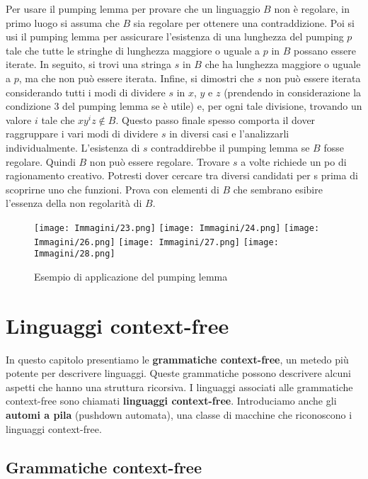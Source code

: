 \documentclass{article}
\begin{document}
Per usare il pumping lemma per provare che un linguaggio $B$ non è regolare, in primo luogo si assuma che $B$ sia regolare per ottenere una contraddizione. Poi si usi il pumping lemma per assicurare l'esistenza di una lunghezza del pumping $p$ tale che tutte le stringhe di lunghezza maggiore o uguale a $p$ in $B$ possano essere iterate. In seguito, si trovi una stringa $s$ in $B$ che ha lunghezza maggiore o uguale a $p$, ma che non può essere iterata. Infine, si dimostri che $s$ non può essere iterata considerando tutti i modi di dividere $s$ in $x$, $y$ e $z$ (prendendo in considerazione la condizione 3 del pumping lemma
se è utile) e, per ogni tale divisione, trovando un valore $i$ tale che $xy^{i}z \notin B$. Questo passo finale spesso comporta il dover raggruppare i vari modi di dividere $s$ in diversi casi e l'analizzarli individualmente. L'esistenza di $s$ contraddirebbe il pumping lemma se $B$ fosse regolare. Quindi $B$ non può essere regolare. Trovare $s$ a volte richiede un po di ragionamento creativo. Potresti dover cercare tra diversi candidati per s prima di scoprirne uno che funzioni. Prova con elementi di $B$ che sembrano esibire l'essenza della non regolarità di $B$.

\begin{figure}[H]
    \centering
    \texttt{[image: Immagini/23.png]}
    \texttt{[image: Immagini/24.png]}
    \texttt{[image: Immagini/26.png]}
    \texttt{[image: Immagini/27.png]}
    \texttt{[image: Immagini/28.png]}
    \caption{Esempio di applicazione del pumping lemma}
    \label{fig:your_image}
\end{figure}
\newpage

\section{Linguaggi context-free}

In questo capitolo presentiamo le \textbf{grammatiche context-free}, un metedo più potente per descrivere linguaggi. Queste grammatiche possono descrivere alcuni aspetti che hanno una struttura ricorsiva.
I linguaggi associati alle grammatiche context-free sono chiamati \textbf{linguaggi context-free}.
Introduciamo anche gli \textbf{automi a pila} (pushdown automata), una classe di macchine che riconoscono i linguaggi context-free.

\subsection{Grammatiche context-free}
\end{document}
